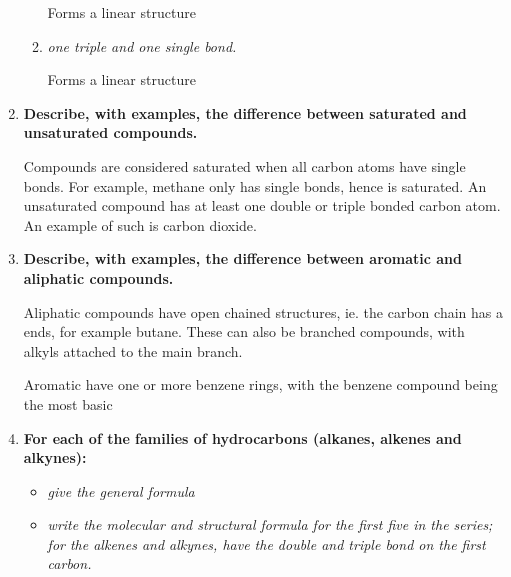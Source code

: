 \documentclass{report}
\begin{document}
\begin{enumerate}
\begin{enumerate}
				Forms a linear structure

			\item \textit{one triple and one single bond.}
				\begin{center}
				\end{center}

				Forms a linear structure

		\end{enumerate}
		    
		\item \textbf{Describe, with examples, the difference between saturated and unsaturated compounds.}

			Compounds are considered saturated when all carbon atoms have single bonds. For example, methane only has single bonds, hence is saturated. An unsaturated compound has at least one double or triple bonded carbon atom. An example of such is carbon dioxide.
		    
		\item \textbf{Describe, with examples, the difference between aromatic and aliphatic compounds.}

			Aliphatic compounds have open chained structures, ie. the carbon chain has a ends, for example butane. These can also be branched compounds, with alkyls attached to the main branch.

			Aromatic have one or more benzene rings, with the benzene compound being the most basic
		    
		\item \textbf{For each of the families of hydrocarbons (alkanes, alkenes and alkynes):}

			\begin{itemize}
				\item \textit{give the general formula}
				\item \textit{write the molecular and structural formula for the first five in the series; for the alkenes and alkynes, have the double and triple bond on the first carbon.}
			\end{itemize}
				

\end{enumerate}
\end{document}
